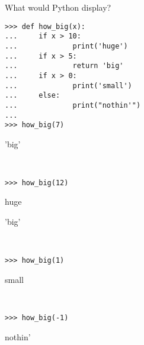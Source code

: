 \question What would Python display?
\begin{lstlisting}
>>> def how_big(x):
...     if x > 10:
...             print('huge')
...     if x > 5:
...             return 'big'
...     if x > 0:
...             print('small')
...     else:
...             print("nothin'")
... 
>>> how_big(7) 
\end{lstlisting} 
\begin{solution}
'big'
\end{solution}
\begin{lstlisting}


>>> how_big(12)
\end{lstlisting} 
\begin{solution}

huge

'big'
\end{solution}
\begin{lstlisting}


>>> how_big(1) 
\end{lstlisting} 
\begin{solution}
small
\end{solution}
\begin{lstlisting}


>>> how_big(-1)
\end{lstlisting}
\begin{solution}
nothin'
\end{solution}
